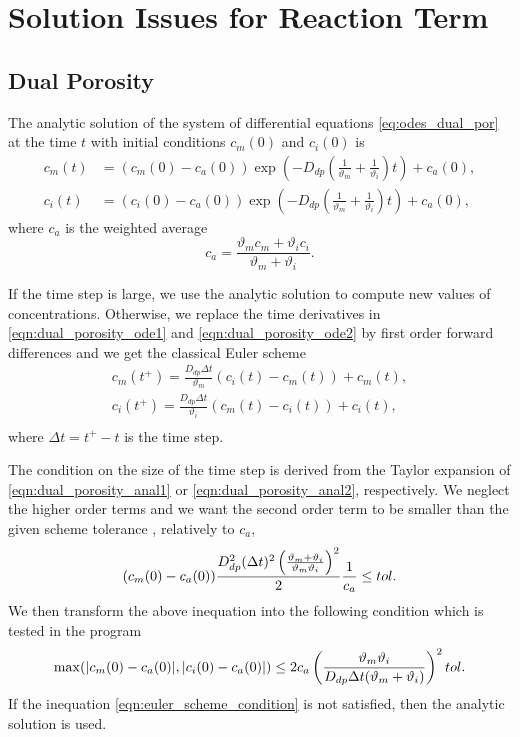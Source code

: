 \section{Solution Issues for Reaction Term}

% 

\subsection{Dual Porosity}

The analytic solution of the system of differential equations \eqref{eq:odes_dual_por} at the time $t$ with initial conditions $c_m(0)$ and $c_i(0)$ is
\begin{align}
     c_m(t) &= (c_m(0) - c_a(0)) \exp\left(- D_{dp}\left(\frac{1}{\vartheta_m} + \frac{1}{\vartheta_i}\right) t \right) + c_a(0), 
     \label{eqn:dual_porosity_anal1}\\
     c_i(t) &= (c_i(0) - c_a(0)) \exp\left(- D_{dp}\left(\frac{1}{\vartheta_m} + \frac{1}{\vartheta_i}\right) t \right) + c_a(0),
     \label{eqn:dual_porosity_anal2}
\end{align}
where $c_a$ is the weighted average
\[
  c_a = \frac{\vartheta_m c_m + \vartheta_i c_i}{\vartheta_m + \vartheta_i}.
\]

If the time step is large, we use the analytic solution to compute new values of concentrations. 
Otherwise, we replace the time derivatives in \eqref{eqn:dual_porosity_ode1} and \eqref{eqn:dual_porosity_ode2} 
by first order forward differences and we get the classical Euler scheme
\begin{align}
  c_m(t^+) = \frac{D_{dp} \Delta t}{\vartheta_m}(c_i(t) - c_m(t)) + c_m(t), \\
  c_i(t^+) = \frac{D_{dp} \Delta t}{\vartheta_i}(c_m(t) - c_i(t)) + c_i(t), \\
\end{align}
where $\Delta t = t^+ - t$ is the time step. 

The condition on the size of the time step is derived from the Taylor expansion of 
\eqref{eqn:dual_porosity_anal1} or \eqref{eqn:dual_porosity_anal2}, respectively. We neglect the higher order 
terms and we want the second order term to be smaller than the given scheme tolerance 
, relatively to $c_a$,
\begin{equation}
  (c_m(0) - c_a(0))
  \frac{ D_{dp}^2 (\Delta t)^2 \left(\frac{\vartheta_m + \vartheta_i}{\vartheta_m \vartheta_i}\right)^2}{2}
  \frac{1}{c_a} \leq tol. \\
\end{equation}
We then transform the above inequation into the following condition which is tested in the program
\begin{equation} \label{eqn:euler_scheme_condition}
  \max(|c_m(0) - c_a(0)|, |c_i(0) - c_a(0)|) \leq 
  2 c_a \left(\frac{\vartheta_m \vartheta_i}{D_{dp} \Delta t (\vartheta_m + \vartheta_i)}\right)^2 tol. \\
\end{equation}
If the inequation \eqref{eqn:euler_scheme_condition} is not satisfied, then the analytic 
solution is used.


